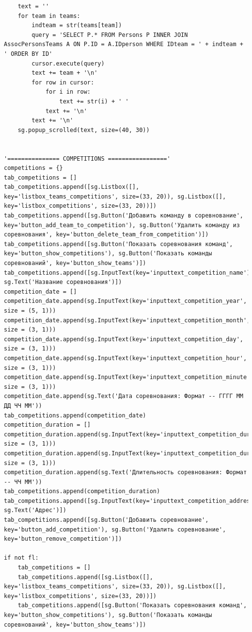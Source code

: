 \documentclass[a4paper,12pt,preview]{report} %
\begin{document}
\begin{verbatim}
    text = ''
    for team in teams:
        indteam = str(teams[team])
        query = 'SELECT P.* FROM Persons P INNER JOIN AssocPersonsTeams A ON P.ID = A.IDperson WHERE IDteam = ' + indteam + ' ORDER BY ID'
        cursor.execute(query)
        text += team + '\n'
        for row in cursor:
            for i in row:
                text += str(i) + ' '
            text += '\n'
        text += '\n'
    sg.popup_scrolled(text, size=(40, 30))

    
'=============== COMPETITIONS ================='
competitions = {}
tab_competitions = []
tab_competitions.append([sg.Listbox([], key='listbox_teams_competitions', size=(33, 20)), sg.Listbox([], key='listbox_competitions', size=(33, 20))])
tab_competitions.append([sg.Button('Добавить команду в соревнование', key='button_add_team_to_competition'), sg.Button('Удалить команду из соревнования', key='button_delete_team_from_competition')])
tab_competitions.append([sg.Button('Показать соревнования команд', key='button_show_competitions'), sg.Button('Показать команды соревнований', key='button_show_teams')])
tab_competitions.append([sg.InputText(key='inputtext_competition_name'), sg.Text('Название соревнования')])
competition_date = []
competition_date.append(sg.InputText(key='inputtext_competition_year', size = (5, 1)))
competition_date.append(sg.InputText(key='inputtext_competition_month', size = (3, 1)))
competition_date.append(sg.InputText(key='inputtext_competition_day', size = (3, 1)))
competition_date.append(sg.InputText(key='inputtext_competition_hour', size = (3, 1)))
competition_date.append(sg.InputText(key='inputtext_competition_minute', size = (3, 1)))
competition_date.append(sg.Text('Дата соревнования: Формат -- ГГГГ ММ ДД ЧЧ ММ'))
tab_competitions.append(competition_date)
competition_duration = []
competition_duration.append(sg.InputText(key='inputtext_competition_duration_hour', size = (3, 1)))
competition_duration.append(sg.InputText(key='inputtext_competition_duration_minute', size = (3, 1)))
competition_duration.append(sg.Text('Длительность соревнования: Формат -- ЧЧ ММ'))
tab_competitions.append(competition_duration)
tab_competitions.append([sg.InputText(key='inputtext_competition_address'), sg.Text('Адрес')])
tab_competitions.append([sg.Button('Добавить соревнование', key='button_add_competition'), sg.Button('Удалить соревнование', key='button_remove_competition')])

if not fl:
    tab_competitions = []
    tab_competitions.append([sg.Listbox([], key='listbox_teams_competitions', size=(33, 20)), sg.Listbox([], key='listbox_competitions', size=(33, 20))])
    tab_competitions.append([sg.Button('Показать соревнования команд', key='button_show_competitions'), sg.Button('Показать команды соревнований', key='button_show_teams')])




\end{verbatim}
\end{document}
